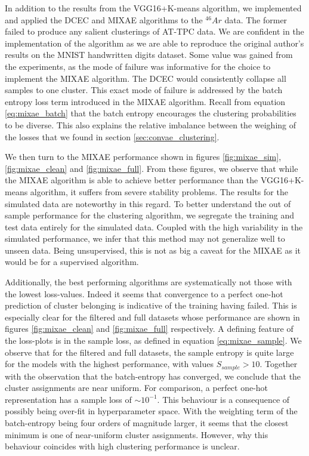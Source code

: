 In addition to the results from the VGG16+K-means algorithm, we implemented and applied the DCEC and MIXAE algorithms to the ${}^{46}Ar$ data. The former failed to produce any salient clusterings of AT-TPC data. We are confident in the implementation of the algorithm as we are able to reproduce the original author's results on the MNIST handwritten digits dataset. Some value was gained from the experiments, as the mode of failure was informative for the choice to implement the MIXAE algorithm. The DCEC would consistently collapse all samples to one cluster. This exact mode of failure is addressed by the batch entropy loss term introduced in the MIXAE algorithm. Recall from equation \ref{eq:mixae_batch} that the batch entropy encourages the clustering probabilities to be diverse. This also explains the relative imbalance between the weighing of the losses that we found in section \ref{sec:convae_clustering}.

We then turn to the MIXAE performance shown in figures \ref{fig:mixae_sim}, \ref{fig:mixae_clean} and \ref{fig:mixae_full}. From these figures, we observe that while the MIXAE algorithm is able to achieve better performance than the VGG16+K-means algorithm, it suffers from severe stability problems. The results for the simulated data are noteworthy in this regard. To better understand the out of sample performance for the clustering algorithm, we segregate the training and test data entirely for the simulated data. Coupled with the high variability in the simulated performance, we infer that this method may not generalize well to unseen data. Being unsupervised, this is not as big a caveat for the MIXAE as it would be for a supervised algorithm.

Additionally, the best performing algorithms are systematically not those with the lowest loss-values. Indeed it seems that convergence to a perfect one-hot prediction of cluster belonging is indicative of the training having failed. This is especially clear for the filtered and full datasets whose performance are shown in figures \ref{fig:mixae_clean} and \ref{fig:mixae_full} respectively. A defining feature of the loss-plots is in the sample loss, as defined in equation \ref{eq:mixae_sample}. We observe that for the filtered and full datasets, the sample entropy is quite large for the models with the highest performance, with values $S_{sample} > 10$. Together with the observation that the batch-entropy has converged, we conclude that the cluster assignments are near uniform. For comparison, a perfect one-hot representation has a sample loss of $\sim 10^{-1}$. This behaviour is a consequence of possibly being over-fit in hyperparameter space. With the weighting term of the batch-entropy being four orders of magnitude larger, it seems that the closest minimum is one of near-uniform cluster assignments. However, why this behaviour coincides with high clustering performance is unclear.


